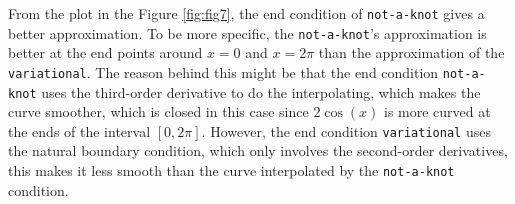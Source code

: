 \begin{answer}
    From the plot in the Figure \ref{fig:fig7}, the end condition of \verb+not-a-knot+ gives a better approximation. To be more specific, the \verb+not-a-knot+'s approximation is better at the end points around $x = 0$ and $x = 2\pi$ than the approximation of the \verb+variational+. The reason behind this might be that the end condition \verb+not-a-knot+ uses the third-order derivative to do the interpolating, which makes the curve smoother, which is closed in this case since $2\cos{(x)}$ is more curved at the ends of the interval $[0,2\pi]$. However, the end condition \verb+variational+ uses the natural boundary condition, which only involves the second-order derivatives, this makes it less smooth than the curve interpolated by the \verb+not-a-knot+ condition.
\end{answer}